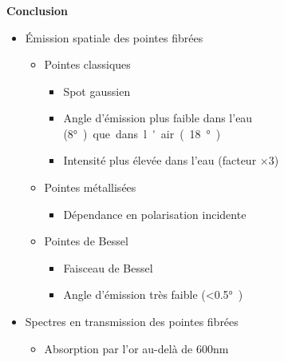 \documentclass[9pt,a9paper,handout]{beamer}
\begin{document}
\begin{frame}
    \frametitle{}
    {\large \textbf{Conclusion}} \vspace*{1mm}
    \begin{itemize}
        \item Émission spatiale des pointes fibrées
            \begin{itemize}
                \item Pointes classiques
                    \begin{itemize}
                        \item {\small Spot gaussien}
                        \vspace*{.5mm}
                        \item {\small Angle d'émission plus faible dans l'eau (8\si\degree) que dans l'air (18\si\degree)}
                        \vspace*{.5mm}
                        \item {\small Intensité plus élevée dans l'eau (facteur $\times 3$)}
                    \end{itemize}
        \vspace*{1mm}
                \item Pointes métallisées
                    \begin{itemize}
                        \item {\small Dépendance en polarisation incidente}
                    \end{itemize}
        \vspace*{1mm}
                \item Pointes de Bessel
                    \begin{itemize}
                        \item {\small Faisceau de Bessel}
                        \vspace*{.5mm}
                        \item {\small Angle d'émission très faible (<0.5\si\degree)}
                    \end{itemize}
            \end{itemize}
            
        \vspace*{2mm}
        \item Spectres en transmission des pointes fibrées
            \begin{itemize}
                \item Absorption par l'or au-delà de 600nm
            \end{itemize}
    \end{itemize}
    

\end{frame}
\end{document}
